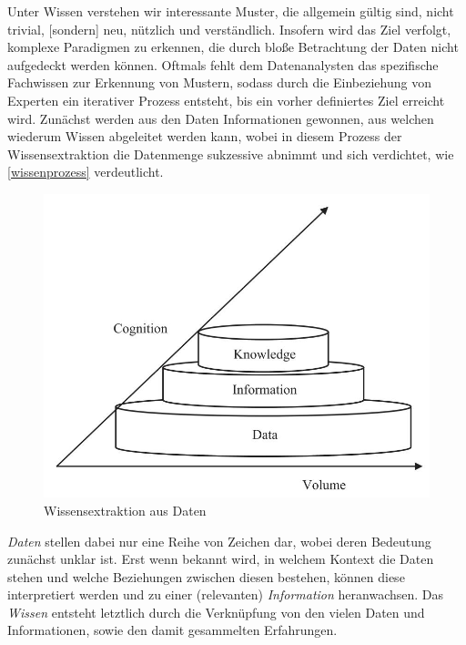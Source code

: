 \glqq Unter Wissen verstehen wir interessante Muster, die allgemein gültig sind, nicht trivial, [sondern] neu, nützlich und verständlich.\grqq{} Insofern wird das Ziel verfolgt, komplexe Paradigmen zu erkennen, die durch bloße Betrachtung der Daten nicht aufgedeckt werden können. Oftmals fehlt dem Datenanalysten das spezifische Fachwissen zur Erkennung von Mustern, sodass durch die Einbeziehung von Experten ein iterativer Prozess entsteht, bis ein vorher definiertes Ziel erreicht wird. Zunächst werden aus den Daten Informationen gewonnen, aus welchen wiederum Wissen abgeleitet werden kann, wobei in diesem Prozess der Wissensextraktion die Datenmenge sukzessive abnimmt und sich verdichtet, wie \vref{wissenprozess} verdeutlicht.

\begin{figure}[H]
\centering
\includegraphics[scale=1.3]{se-wa-jpg/wissenprozess}
\caption[Wissensextraktion aus Daten]{Wissensextraktion aus Daten\protect\footnotemark}
\label{wissenprozess}
\end{figure}

\textit{Daten} stellen dabei nur eine Reihe von Zeichen dar, wobei deren Bedeutung zunächst unklar ist. Erst wenn bekannt wird, in welchem Kontext die Daten stehen und welche Beziehungen zwischen diesen bestehen, können diese interpretiert werden und zu einer (relevanten) \textit{Information} heranwachsen. Das \textit{Wissen} entsteht letztlich durch die Verknüpfung von den vielen Daten und Informationen, sowie den damit gesammelten Erfahrungen.

